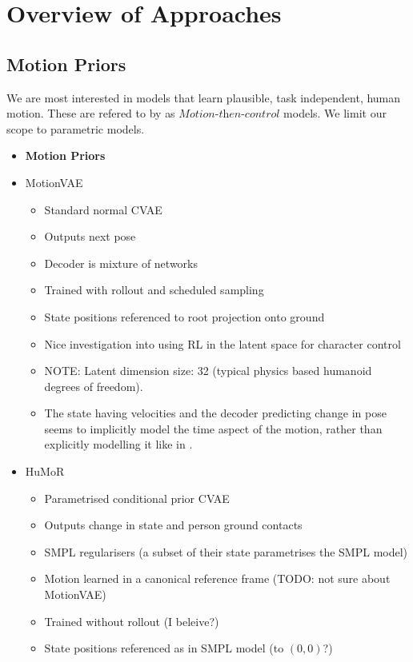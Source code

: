 \section{Overview of Approaches}

\subsection{Motion Priors}
We are most interested in models that learn plausible, task independent, human motion. These are refered to by \cite{MotionVAE} as $\textit{Motion-then-control}$ models. We limit our scope to parametric models.
\begin{itemize}
    \item \textbf{Motion Priors}
    \item MotionVAE \cite{humor}
    \begin{itemize}
        \item Standard normal CVAE
        \item Outputs next pose
        \item Decoder is mixture of networks
        \item Trained with rollout and scheduled sampling
        \item State positions referenced to root projection onto ground
        \item Nice investigation into using RL in the latent space for character control
        \item NOTE: Latent dimension size: 32 (typical physics based humanoid degrees of freedom).
        \item The state having velocities and the decoder predicting change in pose seems to implicitly model the time aspect of the motion, rather than explicitly modelling it like in \cite{structured4Dlatentspace}.
    \end{itemize}
    \item HuMoR \cite{humor}
    \begin{itemize}
        \item Parametrised conditional prior CVAE
        \item Outputs change in state and person ground contacts
        \item SMPL regularisers (a subset of their state parametrises the SMPL model)
        \item Motion learned in a canonical reference frame (TODO: not sure about MotionVAE)
        \item Trained without rollout (I beleive?) 
        \item State positions referenced as in SMPL model (to $(0,0)$?)

\end{itemize}
\end{itemize}
